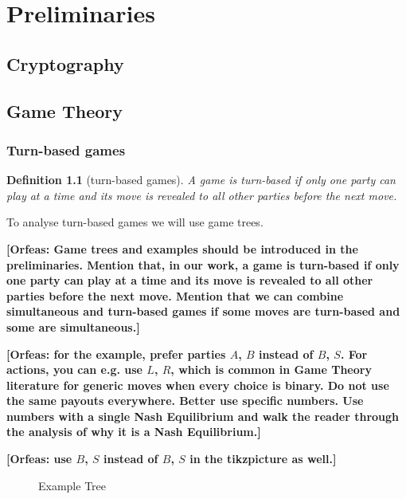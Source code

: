 \documentclass{cacthesis}
\newcommand{\authnote}[3]{{ \footnotesize \textbf{#1[#2: #3]~}}}
\newcommand{\orfnote}[1]{\authnote{\color{blue}}{Orfeas}{#1}}
\newtheorem{definition}{Definition}
\begin{document}
\chapter{Preliminaries}
\section{Cryptography}
\section{Game Theory}
\subsection{Turn-based games}
\begin{definition}[turn-based games]
\label{def:turn-based-game}
A game is turn-based if only one party can play at a time and its move is revealed
to all other parties before the next move.
\end{definition}
To analyse turn-based games we will use game trees.\newline

\orfnote{Game trees and
examples should be introduced in the preliminaries. Mention that, in our work, a
game is turn-based if only one party can play at a time and its move is revealed
to all other parties before the next move. Mention that we can combine
simultaneous and turn-based games if some moves are turn-based and some are
simultaneous.}


\orfnote{for the example, prefer parties $A$, $B$ instead
of $B$, $S$. For actions, you can e.g. use $L$, $R$, which is common in Game
Theory literature for generic moves when every choice is binary. Do not use the
same payouts everywhere. Better use specific numbers. Use numbers with a single
Nash Equilibrium and walk the reader through the analysis of why it is a Nash
Equilibrium.}

\orfnote{use $B$, $S$ instead of $B$, $S$ in the tikzpicture as well.}

\begin{figure}[htb!]
    \centering
    \caption{Example Tree}
    \label{fig:example-tree}
\end{figure}
\end{document}
